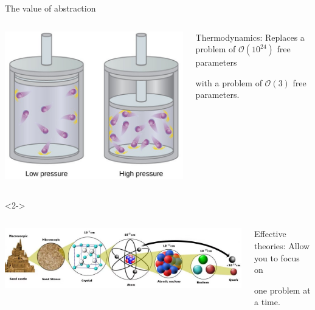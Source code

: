 \documentclass[aspectratio=169]{beamer}
\begin{document}
\begin{frame}{The value of abstraction}
\large
\vspace{0.5 cm}
\begin{columns}
\includegraphics[width=\linewidth]{idealgas.jpg}

\begin{block}{\LARGE Thermodynamics:}
\vspace{0.1 cm}
Replaces a problem of $\mathcal{O}(10^{24})$ free parameters

\vspace{0.1 cm}
with a problem of $\mathcal{O}(3)$ free parameters.
\end{block}
\end{columns}

\vspace{0.8 cm}
\begin{uncoverenv}<2->
\begin{columns}
\includegraphics[width=\linewidth]{atom-proton-quark.png}

\begin{block}{\LARGE Effective theories:}
\vspace{0.1 cm}
Allow you to focus on

\vspace{0.1 cm}
one problem at a time.
\end{block}
\end{columns}
\end{uncoverenv}
\end{frame}
\end{document}
